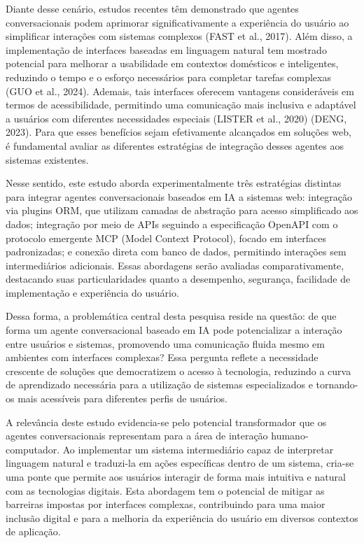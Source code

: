 \documentclass[
]{article}
\begin{document}
Diante desse cenário, estudos recentes têm demonstrado que agentes
conversacionais podem aprimorar significativamente a experiência do
usuário ao simplificar interações com sistemas complexos (FAST et al.,
2017). Além disso, a implementação de interfaces baseadas em linguagem
natural tem mostrado potencial para melhorar a usabilidade em contextos
domésticos e inteligentes, reduzindo o tempo e o esforço necessários
para completar tarefas complexas (GUO et al., 2024). Ademais, tais
interfaces oferecem vantagens consideráveis em termos de acessibilidade,
permitindo uma comunicação mais inclusiva e adaptável a usuários com
diferentes necessidades especiais (LISTER et al., 2020) (DENG, 2023).
Para que esses benefícios sejam efetivamente alcançados em soluções web,
é fundamental avaliar as diferentes estratégias de integração desses
agentes aos sistemas existentes.

Nesse sentido, este estudo aborda experimentalmente três estratégias
distintas para integrar agentes conversacionais baseados em IA a
sistemas web: integração via plugins ORM, que utilizam camadas de
abstração para acesso simplificado aos dados; integração por meio de
APIs seguindo a especificação OpenAPI com o protocolo emergente MCP
(Model Context Protocol), focado em interfaces padronizadas; e conexão
direta com banco de dados, permitindo interações sem intermediários
adicionais. Essas abordagens serão avaliadas comparativamente,
destacando suas particularidades quanto a desempenho, segurança,
facilidade de implementação e experiência do usuário.

Dessa forma, a problemática central desta pesquisa reside na questão: de
que forma um agente conversacional baseado em IA pode potencializar a
interação entre usuários e sistemas, promovendo uma comunicação fluida
mesmo em ambientes com interfaces complexas? Essa pergunta reflete a
necessidade crescente de soluções que democratizem o acesso à
tecnologia, reduzindo a curva de aprendizado necessária para a
utilização de sistemas especializados e tornando-os mais acessíveis para
diferentes perfis de usuários.

A relevância deste estudo evidencia-se pelo potencial transformador que
os agentes conversacionais representam para a área de interação
humano-computador. Ao implementar um sistema intermediário capaz de
interpretar linguagem natural e traduzi-la em ações específicas dentro
de um sistema, cria-se uma ponte que permite aos usuários interagir de
forma mais intuitiva e natural com as tecnologias digitais. Esta
abordagem tem o potencial de mitigar as barreiras impostas por
interfaces complexas, contribuindo para uma maior inclusão digital e
para a melhoria da experiência do usuário em diversos contextos de
aplicação.
\end{document}
